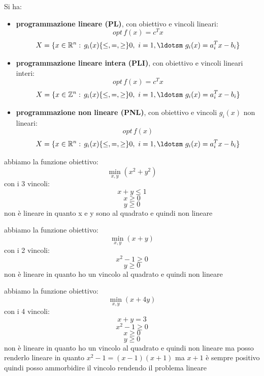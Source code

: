 \documentclass[a4paper,12pt, oneside]{book}
\begin{document}
Si ha:
\begin{itemize}
  \item \textbf{programmazione lineare (PL)}, con obiettivo e vincoli
  lineari:
  \[opt\,f(x)=c^T x\]
  \[X=\{x\in\mathbb{R}^n:\, g_i(x)\{\leq, =, \geq\}0,\,\,
    i=1,\ldotsm\,\, g_i(x)=a_i^T x-b_i\}\]
  \item \textbf{programmazione lineare intera (PLI)}, con obiettivo e
  vincoli lineari interi:
  \[opt\,f(x)=c^T x\]
  \[X=\{x\in\mathbb{Z}^n:\, g_i(x)\{\leq, =, \geq\}0,\,\,
    i=1,\ldotsm\,\, g_i(x)=a_i^T x-b_i\}\]
  \item \textbf{programmazione non lineare (PNL)}, con obiettivo e
  vincoli $g_i(x)$ non lineari:
  \[opt\,f(x)\]
  \[X=\{x\in\mathbb{R}^n:\, g_i(x)\{\leq, =, \geq\}0,\,\,
    i=1,\ldotsm\,\, g_i(x)=a_i^T x-b_i\}\]
\end{itemize}
\begin{esempio}
  abbiamo la funzione obiettivo:
  \[\min_{x,y}(x^2+y^2)\]
  con i 3 vincoli:
  \[x+y\leq 1\]
  \[x\geq 0\]
  \[y\geq 0\]
  non è lineare in quanto x e y sono al quadrato e quindi non lineare
\end{esempio}
\begin{esempio}
  abbiamo la funzione obiettivo:
  \[\min_{x,y}(x+y)\]
  con i 2 vincoli:
  \[x^2-1\geq 0\]
  \[y\geq 0\]
  non è lineare in quanto ho un vincolo al quadrato e quindi non
  lineare 
\end{esempio}
\begin{esempio}
  abbiamo la funzione obiettivo:
  \[\min_{x,y}(x+4y)\]
  con i 4 vincoli:
  \[x+y=3\]
  \[x^2-1\geq 0\]
  \[x\geq 0\]
  \[y\geq 0\]
  non è lineare in quanto ho un vincolo al quadrato e quindi non
  lineare ma posso renderlo lineare in quanto $x^2-1=(x-1)(x+1)$ ma
  $x+1$ è sempre positivo quindi posso ammorbidire il vincolo
  rendendo il problema lineare
\end{esempio}
\end{document}
